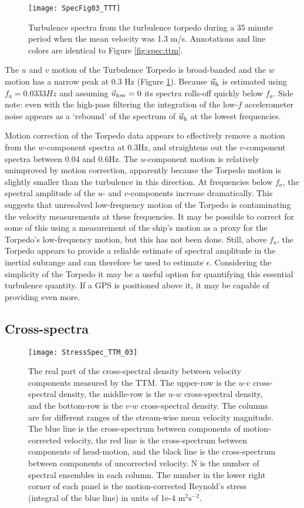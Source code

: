 \begin{figure}[t]
  \centering
  \texttt{[image: SpecFig03\_TTT]}
  \caption{Turbulence spectra from the turbulence torpedo during a 35 minute period when the mean velocity was 1.3 m/s. Annotations and line colors are identical to Figure \ref{fig:spec:ttm}.}
  \label{fig:spec:torpedo}
\end{figure}

The $u$ and $v$ motion of the Turbulence Torpedo is broad-banded and the $w$ motion has a narrow peak at 0.3 Hz (Figure \ref{fig:spec:torpedo}). Because $\vec{u}_\mathrm{h}$ is estimated using $f_a = 0.0333Hz$ and assuming $\vec{u}_\mathrm{low}=0$ its spectra rolls-off quickly below $f_a$. Side note: even with the high-pass filtering the integration of the low-$f$ accelerometer noise appears as a `rebound' of the spectrum of $\vec{u}_\mathrm{h}$ at the lowest frequencies.

Motion correction of the Torpedo data appears to effectively remove a motion from the $w$-component spectra at 0.3Hz, and straightens out the $v$-component spectra between 0.04 and 0.6Hz. The $u$-component motion is relatively unimproved by motion correction, apparently because the Torpedo motion is slightly smaller than the turbulence in this direction. At frequencies below $f_a$, the spectral amplitude of the $u$- and $v$-components increase dramatically. This suggests that unresolved low-frequency motion of the Torpedo is contaminating the velocity measurements at these frequencies. It may be possible to correct for some of this using a measurement of the ship's motion as a proxy for the Torpedo's low-frequency motion, but this has not been done. Still, above $f_a$, the Torpedo appears to provide a reliable estimate of spectral amplitude in the inertial subrange and can therefore be used to estimate $\epsilon$. Considering the simplicity of the Torpedo it may be a useful option for quantifying this essential turbulence quantity. If a GPS is positioned above it, it may be capable of providing even more.

\subsection{Cross-spectra}

\begin{figure*}[t]
  \centering
  \texttt{[image: StressSpec\_TTM\_03]}
  \caption{The real part of the cross-spectral density between velocity components measured by the TTM. The upper-row is the $u$-$v$ cross-spectral density, the middle-row is the $u$-$w$ cross-spectral density, and the bottom-row is the $v$-$w$ cross-spectral density.  The columns are for different ranges of the stream-wise mean velocity magnitude. The blue line is the cross-spectrum between components of motion-corrected velocity, the red line is the cross-spectrum between components of head-motion, and the black line is the cross-spectrum between components of uncorrected velocity. N is the number of spectral ensembles in each column. The number in the lower right corner of each panel is the motion-corrected Reynold's stress (integral of the blue line) in units of 1e-4 $\mathrm{m^2s^{-2}}$.}
  \label{fig:cspec:ttm}
\end{figure*}


